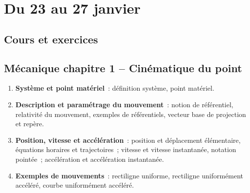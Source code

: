 \documentclass[a4paper, 12pt, final, garamond]{book}
\begin{document}
\setcounter{chapter}{15}

\chapter{Du 23 au 27 janvier}

\section{Cours et exercices}
\section*{Mécanique chapitre 1 -- Cinématique du point}
\begin{enumerate}[label=\Roman*]
    \item \textbf{Système et point matériel}~: définition système, point
        matériel.
    \item \textbf{Description et paramétrage du mouvement}~: notion de
        référentiel, relativité du mouvement, exemples de référentiels, vecteur
        base de projection et repère.
    \item \textbf{Position, vitesse et accélération}~: position et déplacement
        élémentaire, équations horaires et trajectoires~; vitesse et vitesse
        instantanée, notation pointée~; accélération et accélération
        instantanée.
    \item \textbf{Exemples de mouvements}~: rectiligne uniforme, rectiligne
        uniformément accéléré, courbe uniformément accéléré.
\end{enumerate}
\end{document}
